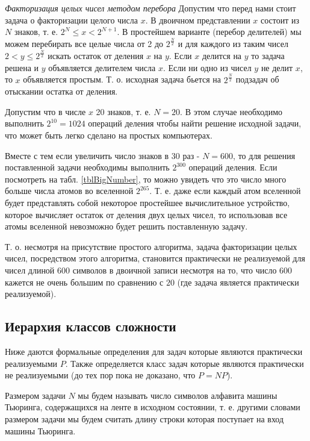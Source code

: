\begin{example}
\emph{Факторизация целых чисел методом перебора}
\label{exAddAlgoTrialDivision}
Допустим что перед нами стоит задача о факторизации целого числа $x$. В
двоичном представлении $x$ состоит из $N$ знаков, т. е. 
$2^N \le x < 2^{N+1}$. В простейшем варианте (перебор делителей) мы
можем перебирать все целые числа от 2 до $2^{\frac{N}{2}}$ и для
каждого из таким чисел $2 < y \le 2^{\frac{N}{2}}$ искать остаток от
деления $x$ на $y$. Если $x$ делится на $y$ то задача решена и $y$
объявляется делителем числа $x$. Если ни одно из чисел $y$ не делит
$x$, то $x$ объявляется простым.
Т. о. исходная задача бьется на $2^{\frac{N}{2}}$ подзадач об отыскании
остатка от деления.

Допустим что в числе $x$ 20 знаков, т. е. $N=20$. В этом случае
необходимо выполнить $2^{10} = 1024$ операций деления чтобы найти
решение исходной задачи, что может быть легко сделано на простых
компьютерах. 

Вместе с тем если увеличить число знаков в 30 раз - $N=600$, то для
решения поставленной задачи необходимы выполнить $2^{300}$ операций
деления. Если посмотреть на табл. \ref{tblBigNumber}, то можно увидеть
что это число много больше числа атомов во вселенной
$2^{265}$. Т. е. даже если каждый атом вселенной будет представлять
собой некоторое простейшее вычислительное устройство, которое
вычисляет остаток от деления двух целых чисел, то использовав все
атомы вселенной невозможно будет решить поставленную задачу. 

Т. о. несмотря на присутствие простого алгоритма, задача факторизации
целых чисел, посредством этого алгоритма, становится практически
не реализуемой для чисел длиной $600$ символов в двоичной записи
несмотря на то, что число $600$ кажется не очень большим по сравнению
с $20$ (где задача является практически реализуемой).
\end{example}


\subsection{Иерархия классов сложности}

Ниже даются формальные определения для задач которые являются
практически реализуемыми $P$. Также определяется класс задач которые
являются практически не реализуемыми (до тех пор пока не доказано, что
$P = NP$).

\begin{definition}
Размером задачи $N$ мы будем называть число символов алфавита машины
Тьюринга, содержащихся на ленте в исходном состоянии, т. е. другими
словами размером задачи мы будем считать длину строки которая
поступает на вход машины Тьюринга.
\end{definition}

